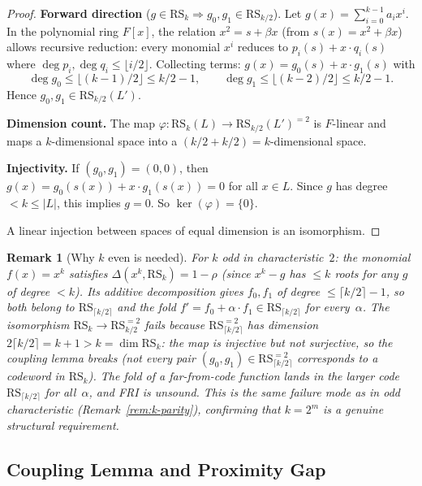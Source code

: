 \documentclass[11pt]{article}
\newtheorem{remark}[theorem]{Remark}
\newcommand{\RS}{\mathrm{RS}}
\begin{document}
\begin{proof}
\textbf{Forward direction} ($g \in \RS_k \Rightarrow g_0, g_1 \in \RS_{k/2}$). Let $g(x) = \sum_{i=0}^{k-1} a_i x^i$. In the polynomial ring $F[x]$, the relation $x^2 = s + \beta x$ (from $s(x) = x^2 + \beta x$) allows recursive reduction: every monomial $x^i$ reduces to $p_i(s) + x \cdot q_i(s)$ where $\deg p_i, \deg q_i \leq \lfloor i/2 \rfloor$. Collecting terms: $g(x) = g_0(s) + x \cdot g_1(s)$ with
$$\deg g_0 \leq \lfloor (k{-}1)/2 \rfloor \leq k/2 - 1, \qquad \deg g_1 \leq \lfloor (k{-}2)/2 \rfloor \leq k/2 - 1.$$
Hence $g_0, g_1 \in \RS_{k/2}(L')$.

\textbf{Dimension count.} The map $\varphi: \RS_k(L) \to \RS_{k/2}(L')^{=2}$ is $F$-linear and maps a $k$-dimensional space into a $(k/2 + k/2) = k$-dimensional space.

\textbf{Injectivity.} If $(g_0, g_1) = (0, 0)$, then $g(x) = g_0(s(x)) + x \cdot g_1(s(x)) = 0$ for all $x \in L$. Since $g$ has degree $< k \leq |L|$, this implies $g = 0$. So $\ker(\varphi) = \{0\}$.

A linear injection between spaces of equal dimension is an isomorphism.
\end{proof}

\begin{remark}[Why $k$ even is needed]
\label{rem:k-parity-char2}
For $k$ odd in characteristic~$2$: the monomial $f(x) = x^k$ satisfies $\Delta(x^k, \RS_k) = 1{-}\rho$ (since $x^k - g$ has $\leq k$ roots for any $g$ of degree $< k$). Its additive decomposition gives $f_0, f_1$ of degree $\leq \lceil k/2 \rceil - 1$, so both belong to $\RS_{\lceil k/2 \rceil}$ and the fold $f' = f_0 + \alpha \cdot f_1 \in \RS_{\lceil k/2 \rceil}$ for every~$\alpha$. The isomorphism $\RS_k \to \RS_{k/2}^{=2}$ fails because $\RS_{\lceil k/2 \rceil}^{=2}$ has dimension $2\lceil k/2 \rceil = k{+}1 > k = \dim \RS_k$: the map is injective but not surjective, so the coupling lemma breaks (not every pair $(g_0, g_1) \in \RS_{\lceil k/2 \rceil}^{=2}$ corresponds to a codeword in $\RS_k$). The fold of a far-from-code function lands in the larger code $\RS_{\lceil k/2 \rceil}$ for all~$\alpha$, and FRI is unsound. This is the same failure mode as in odd characteristic (Remark~\ref{rem:k-parity}), confirming that $k = 2^m$ is a genuine structural requirement.
\end{remark}

\subsection{Coupling Lemma and Proximity Gap}
\end{document}
